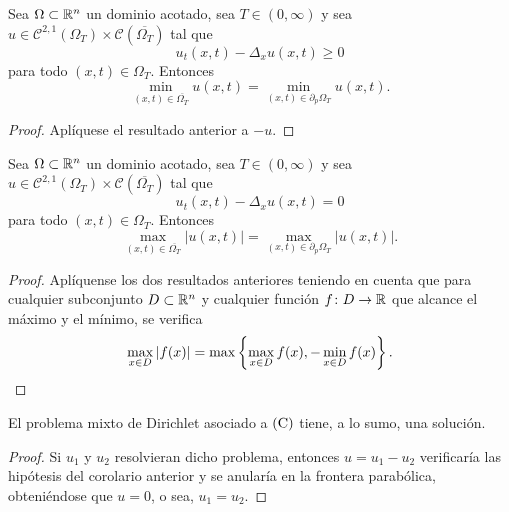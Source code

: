 \documentclass[a4paper, 12pt, extrafontsizes]{memoir}
\begin{document}
\begin{corollary}
    Sea $\Omega \subset \mathbb R^n$ un dominio acotado, sea $T \in (0,\infty)$ y sea $u \in \mathcal{C}^{2,1}(\Omega_T) \times \mathcal{C}(\overline{\Omega_T})$ tal que
    \[u_t(x,t)-\Delta_xu(x,t) \geq 0\]
    para todo $(x,t) \in \Omega_T$. Entonces
    \[\min_{(x,t)\in \overline{\Omega_T}} u(x,t) = \min_{(x,t) \in \partial_p\Omega_T}u(x,t).\]
\end{corollary}

\begin{proof}
    Aplíquese el resultado anterior a $-u$.
\end{proof}

\begin{corollary}
    Sea $\Omega \subset \mathbb R^n$ un dominio acotado, sea $T \in (0,\infty)$ y sea $u \in \mathcal{C}^{2,1}(\Omega_T) \times \mathcal{C}(\overline{\Omega_T})$ tal que
    \[u_t(x,t)-\Delta_xu(x,t) = 0\]
    para todo $(x,t) \in \Omega_T$. Entonces
    \[\max_{(x,t)\in \overline{\Omega_T}} |u(x,t)| = \max_{(x,t) \in \partial_p\Omega_T}|u(x,t)|.\]
\end{corollary}

\begin{proof}
    Aplíquense los dos resultados anteriores teniendo en cuenta que para cualquier subconjunto $D \subset \mathbb R^n$ y cualquier función $f \colon D \to \mathbb R$ que alcance el máximo y el mínimo, se verifica
    \[\max_{x \in D} |f(x)| = \max\left\{\max_{x \in D}f(x),-\min_{x \in D}f(x)\right\}. \qedhere\]
\end{proof}

\begin{theorem}
    El problema mixto de Dirichlet asociado a $\textup{(C)}$ tiene, a lo sumo, una solución. 
\end{theorem}

\begin{proof}
    Si $u_1$ y $u_2$ resolvieran dicho problema, entonces $u = u_1-u_2$ verificaría las hipótesis del corolario anterior y se anularía en la frontera parabólica, obteniéndose que $u = 0$, o sea, $u_1=u_2$.
\end{proof}
\end{document}
